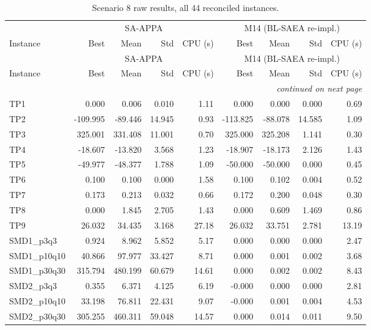 \begingroup\scriptsize
\begin{longtable}{lrrrrrrrr}
\caption{Scenario 8 raw results, all 44 reconciled instances.}\label{tab:scenario8}\\
\toprule
 & \multicolumn{4}{c}{SA-APPA} & \multicolumn{4}{c}{M14 (BL-SAEA re-impl.)} \\
\cmidrule(lr){2-5} \cmidrule(lr){6-9}
Instance & Best & Mean & Std & CPU (s) & Best & Mean & Std & CPU (s) \\
\midrule
\endfirsthead
\toprule
 & \multicolumn{4}{c}{SA-APPA} & \multicolumn{4}{c}{M14 (BL-SAEA re-impl.)} \\
\cmidrule(lr){2-5} \cmidrule(lr){6-9}
Instance & Best & Mean & Std & CPU (s) & Best & Mean & Std & CPU (s) \\
\midrule
\endhead
\midrule\multicolumn{9}{r}{\emph{continued on next page}}\\\midrule
\endfoot
\bottomrule
\endlastfoot
TP1 & 0.000 & 0.006 & 0.010 & 1.11 & 0.000 & 0.000 & 0.000 & 0.69 \\
TP2 & -109.995 & -89.446 & 14.945 & 0.93 & -113.825 & -88.078 & 14.585 & 1.09 \\
TP3 & 325.001 & 331.408 & 11.001 & 0.70 & 325.000 & 325.208 & 1.141 & 0.30 \\
TP4 & -18.607 & -13.820 & 3.568 & 1.23 & -18.907 & -18.173 & 2.126 & 1.43 \\
TP5 & -49.977 & -48.377 & 1.788 & 1.09 & -50.000 & -50.000 & 0.000 & 0.45 \\
TP6 & 0.100 & 0.100 & 0.000 & 1.58 & 0.100 & 0.102 & 0.004 & 0.52 \\
TP7 & 0.173 & 0.213 & 0.032 & 0.66 & 0.172 & 0.200 & 0.048 & 0.30 \\
TP8 & 0.000 & 1.845 & 2.705 & 1.43 & 0.000 & 0.609 & 1.469 & 0.86 \\
TP9 & 26.032 & 34.435 & 3.168 & 27.18 & 26.032 & 33.751 & 2.781 & 13.19 \\
SMD1\_p3q3 & 0.924 & 8.962 & 5.852 & 5.17 & 0.000 & 0.000 & 0.000 & 2.47 \\
SMD1\_p10q10 & 40.866 & 97.977 & 33.427 & 8.71 & 0.000 & 0.001 & 0.002 & 3.68 \\
SMD1\_p30q30 & 315.794 & 480.199 & 60.679 & 14.61 & 0.000 & 0.002 & 0.002 & 8.43 \\
SMD2\_p3q3 & 0.355 & 6.371 & 4.125 & 6.19 & -0.000 & 0.000 & 0.000 & 2.81 \\
SMD2\_p10q10 & 33.198 & 76.811 & 22.431 & 9.07 & -0.000 & 0.001 & 0.004 & 4.53 \\
SMD2\_p30q30 & 305.255 & 460.311 & 59.048 & 14.57 & 0.000 & 0.014 & 0.011 & 9.50 \\

\end{longtable}

